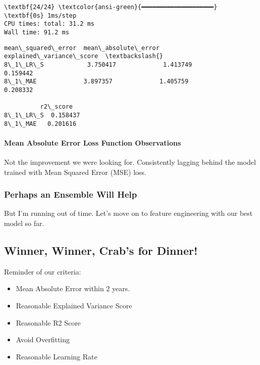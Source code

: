 \documentclass[11pt]{article}
\makeatletter
\providecommand{\tightlist}{%
      \setlength{\itemsep}{0pt}\setlength{\parskip}{0pt}}
\newcommand{\boxspacing}{\kern\kvtcb@left@rule\kern\kvtcb@boxsep}
\newcommand{\prompt}[4]{
        {\ttfamily\llap{{\color{#2}[#3]:\hspace{3pt}#4}}\vspace{-\baselineskip}}
    }
\makeatother
\begin{document}
    \begin{Verbatim}[commandchars=\\\{\}]
\textbf{24/24} \textcolor{ansi-green}{━━━━━━━━━━━━━━━━━━━━} \textbf{0s} 1ms/step
CPU times: total: 31.2 ms
Wall time: 91.2 ms
    \end{Verbatim}

            \begin{tcolorbox}[breakable, size=fbox, boxrule=.5pt, pad at break*=1mm, opacityfill=0]
\prompt{Out}{outcolor}{94}{\boxspacing}
\begin{Verbatim}[commandchars=\\\{\}]
          mean\_squared\_error  mean\_absolute\_error  explained\_variance\_score  \textbackslash{}
8\_1\_LR\_S            3.750417             1.413749                  0.159442
8\_1\_MAE             3.897357             1.405759                  0.208332

          r2\_score
8\_1\_LR\_S  0.158437
8\_1\_MAE   0.201616
\end{Verbatim}
\end{tcolorbox}
        
    \paragraph{Mean Absolute Error Loss Function
Observations}\label{mean-absolute-error-loss-function-observations}

Not the improvement we were looking for. Consistently lagging behind the
model trained with Mean Squared Error (MSE) loss.

    \subsubsection{Perhaps an Ensemble Will
Help}\label{perhaps-an-ensemble-will-help}

But I'm running out of time. Let's move on to feature engineering with
our best model so far.

\subsection{Winner, Winner, Crab's for
Dinner!}\label{winner-winner-crabs-for-dinner}

Reminder of our criteria:

\begin{itemize}
\tightlist
\item
  Mean Absolute Error within 2 years.
\item
  Reasonable Explained Variance Score
\item
  Reasonable R2 Score
\item
  Avoid Overfitting
\item
  Reasonable Learning Rate
\end{itemize}
\end{document}
